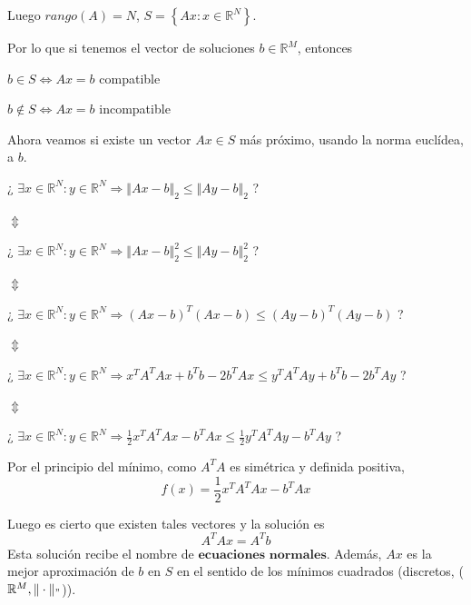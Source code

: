 Luego $rango(A) = N$, $S = \left\lbrace Ax : x \in \mathbb{R}^N \right\rbrace$.

Por lo que si tenemos el vector de soluciones $b \in \mathbb{R}^M$, entonces
	\begin{nlist}
		\item $b \in S \Leftrightarrow Ax = b $ compatible
		\item $b \notin S \Leftrightarrow Ax = b $ incompatible
	\end{nlist}
	
Ahora veamos si existe un vector $Ax \in S$ más próximo, usando la norma euclídea, a $b$.

¿ $\exists x \in \mathbb{R}^N : y \in \mathbb{R}^N \Rightarrow \Vert Ax-b \Vert _2 \leq \Vert Ay-b \Vert _2$ ?

$\Updownarrow$

¿ $\exists x \in \mathbb{R}^N : y \in \mathbb{R}^N \Rightarrow \Vert Ax-b \Vert _2^2 \leq \Vert Ay-b \Vert _2^2$ ?

$\Updownarrow$

¿ $\exists x \in \mathbb{R}^N : y \in \mathbb{R}^N \Rightarrow (Ax-b)^T (Ax-b) \leq (Ay-b)^T(Ay-b) $ ?

$\Updownarrow$

¿ $\exists x \in \mathbb{R}^N : y \in \mathbb{R}^N \Rightarrow x^TA^TAx+b^Tb-2b^TAx \leq y^TA^TAy+b^Tb-2b^TAy $ ?

$\Updownarrow$

¿ $\exists x \in \mathbb{R}^N : y \in \mathbb{R}^N \Rightarrow \frac{1}{2} x^TA^TAx - b^TAx \leq \frac{1}{2} y^TA^TAy - b^TAy $ ?

Por el principio del mínimo, como $A^TA$ es simétrica y definida positiva,
$$ f(x) = \frac{1}{2}x^TA^TAx-b^TAx$$

Luego es cierto que existen tales vectores y la solución es
$$A^TAx = A^Tb$$
Esta solución recibe el nombre de $\textbf{ecuaciones normales}$. Además, $Ax$ es la mejor aproximación de $b$ en $S$ en el sentido de los mínimos cuadrados (discretos, ($\mathbb{R}^M, \Vert \cdot \Vert _"$)).

